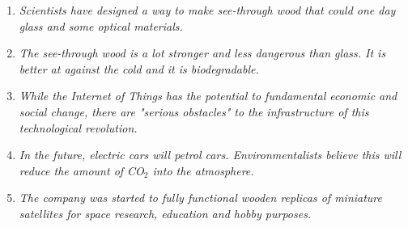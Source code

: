 \begin{enumerate}
      \item \textit{Scientists have designed a way to make see-through wood that could one day \underline{\hspace{2cm}} glass and some optical materials.}
      \item \textit{The see-through wood is a lot stronger and less dangerous than glass. It is better at \underline{\hspace{2cm}} against the cold and it is biodegradable.}
      \item \textit{While the Internet of Things has the potential to \underline{\hspace{2cm}} fundamental economic and social change, there are "serious obstacles" to \underline{\hspace{2cm}} the infrastructure of this technological revolution.}
      \item \textit{In the future, electric cars will \underline{\hspace{2cm}} petrol cars. Environmentalists believe this will reduce the amount of CO$_2$ \underline{\hspace{2cm}} into the atmosphere.}
      \item \textit{The company was started to \underline{\hspace{2cm}} fully functional wooden replicas of miniature satellites \underline{\hspace{2cm}} for space research, education and hobby purposes.}
\end{enumerate}

